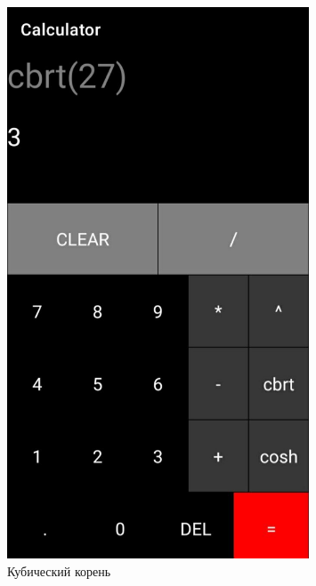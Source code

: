 \documentclass[a4paper, 14pt]{extarticle}
\begin{document}
\begin{figure}[!htb]
	\centering
	\includegraphics[width=0.8\textwidth]{img2}
\caption{Кубический корень}
\label{fig:img2}
\end{figure}
\end{document}
